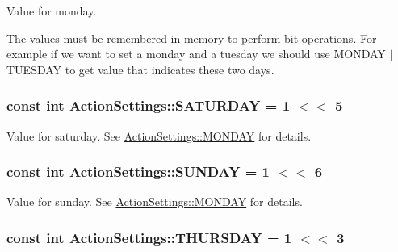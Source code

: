 Value for monday. 

The values must be remembered in memory to perform bit operations. For example if we want to set a monday and a tuesday we should use M\-O\-N\-D\-A\-Y $|$ T\-U\-E\-S\-D\-A\-Y to get value that indicates these two days. \hypertarget{class_action_settings_ad4e99d88dfbfa0b2d920bf87fe2f9f4c}{
\subsubsection[{S\-A\-T\-U\-R\-D\-A\-Y}]{\setlength{\rightskip}{0pt plus 5cm}const int Action\-Settings\-::\-S\-A\-T\-U\-R\-D\-A\-Y = 1 $<$$<$ 5\hspace{0.3cm}{\ttfamily [static]}}}\label{class_action_settings_ad4e99d88dfbfa0b2d920bf87fe2f9f4c}


Value for saturday. See \hyperlink{class_action_settings_a0a99a4562e37a11225063d1a10e0953a}{Action\-Settings\-::\-M\-O\-N\-D\-A\-Y} for details. 

\hypertarget{class_action_settings_a84bc1afcb432a8274a028cd21cc416f6}{
\subsubsection[{S\-U\-N\-D\-A\-Y}]{\setlength{\rightskip}{0pt plus 5cm}const int Action\-Settings\-::\-S\-U\-N\-D\-A\-Y = 1 $<$$<$ 6\hspace{0.3cm}{\ttfamily [static]}}}\label{class_action_settings_a84bc1afcb432a8274a028cd21cc416f6}


Value for sunday. See \hyperlink{class_action_settings_a0a99a4562e37a11225063d1a10e0953a}{Action\-Settings\-::\-M\-O\-N\-D\-A\-Y} for details. 

\hypertarget{class_action_settings_af4382214fc4cb662884ba314009ed4d6}{
\subsubsection[{T\-H\-U\-R\-S\-D\-A\-Y}]{\setlength{\rightskip}{0pt plus 5cm}const int Action\-Settings\-::\-T\-H\-U\-R\-S\-D\-A\-Y = 1 $<$$<$ 3\hspace{0.3cm}{\ttfamily [static]}}}\label{class_action_settings_af4382214fc4cb662884ba314009ed4d6}


